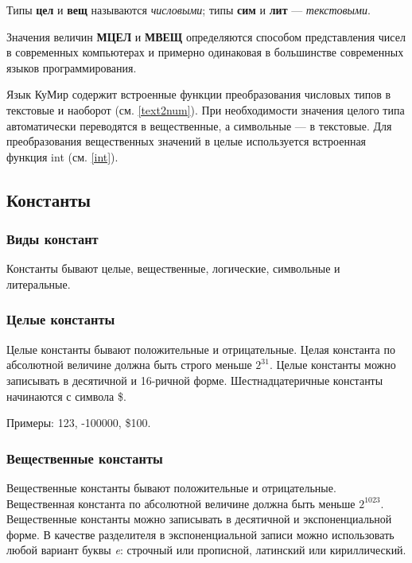 	Типы \textbf{цел} и \textbf{вещ} называются \emph{числовыми}; типы \textbf{сим} и \textbf{лит} --- \emph{текстовыми}.

Значения величин \textbf{МЦЕЛ} и \textbf{МВЕЩ} определяются способом представления чисел в современных компьютерах и примерно одинаковая в большинстве современных языков программирования.  

Язык КуМир содержит встроенные функции преобразования числовых типов в текстовые и наоборот (см. \ref{text2num}).  При необходимости значения целого типа автоматически переводятся в вещественные, а символьные --- в текстовые. Для преобразования вещественных значений в целые используется встроенная функция \textsf{int} (см. \ref{int}).


\subsection{Константы}

\subsubsection{Виды констант}

	Константы бывают целые, вещественные, логические, символьные и литеральные.
 
\subsubsection{Целые константы}

Целые константы бывают положительные и отрицательные. Целая константа по абсолютной величине должна быть строго меньше $2^{31}$. Целые константы можно записывать в десятичной и 16-ричной форме. Шестнадцатеричные константы начинаются с символа \$.

Примеры: \textsf{123, -100000, \$100}.

\subsubsection{Вещественные константы}

Вещественные константы бывают положительные и отрицательные. Вещественная константа по абсолютной величине должна быть меньше $2^{1023}$. Вещественные константы можно записывать в десятичной и экспоненциальной форме. В качестве разделителя в экспоненциальной записи можно использовать любой вариант буквы \emph{e}: строчный или прописной, латинский или кириллический.

